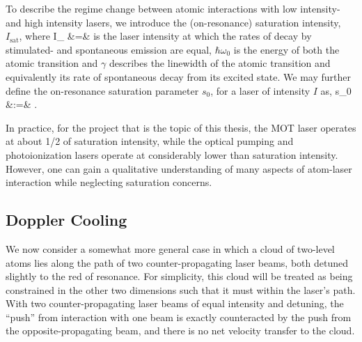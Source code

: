 To describe the regime change between atomic interactions with low intensity- and high intensity lasers, we introduce the (on-resonance) saturation intensity, $I_{\mathrm{sat}}$, where 
\bea
I_{} &=& 
\eea
is the laser intensity at which the rates of decay by stimulated- and spontaneous emission are equal, $\hbar \omega_0$ is the energy of both the atomic transition %
and $\gamma$ describes the linewidth of the atomic transition and equivalently its rate of spontaneous decay from its excited state.  We may further define the on-resonance saturation parameter $s_0$, for a laser of intensity $I$ as,
\bea
s_0 &:=& .
\eea

In practice, for the project that is the topic of this thesis, the MOT laser operates at about 1/2 of saturation intensity, while the optical pumping
and photoionization lasers operate at considerably lower than saturation
intensity. However, one can gain
a qualitative understanding of many aspects of atom-laser interaction while neglecting saturation concerns.  

%

\subsection{Doppler Cooling}
We now consider a somewhat more general case in which a cloud of two-level atoms lies along the path of two counter-propagating laser beams, both detuned slightly to the red of resonance.  For simplicity, this cloud will be treated as being constrained in the other two dimensions such that it must within the laser's path.  With two counter-propagating laser beams of equal intensity and detuning, the ``push'' from interaction with one beam is exactly counteracted by the push from the opposite-propagating beam, and there is no net velocity transfer to the cloud.  


